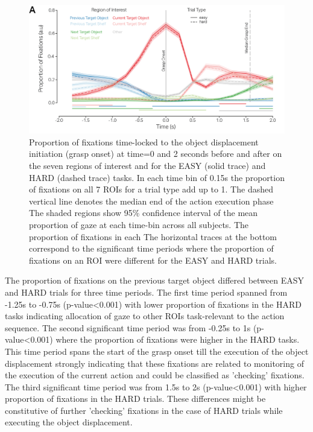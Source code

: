 \begin{figure}[t]
    \centering
    \includegraphics[width=0.9\linewidth]{source/figures/results/results_2.png}
    \caption[Time course of fixations]{Proportion of fixations time-locked to the object displacement initiation (grasp onset) at time=0 and 2 seconds before and after on the seven regions of interest and for the EASY (solid trace) and HARD (dashed trace) tasks. In each time bin of 0.15s the proportion of fixations on all 7 ROIs for a trial type add up to 1. The dashed vertical line denotes the median end of the action execution phase The shaded regions show 95\% confidence interval of the mean proportion of gaze at each time-bin across all subjects. The proportion of fixations in each The horizontal traces at the bottom correspond to the significant time periods where the proportion of fixations on an ROI were different for the EASY and HARD trials.}
    \label{figure:action_locked}
\end{figure}


The proportion of fixations on the previous target object differed between EASY and HARD trials for three time periods. The first time period spanned from -1.25s to -0.75s (p-value<0.001) with lower proportion of fixations in the HARD tasks indicating allocation of gaze to other ROIs task-relevant to the action sequence. The second significant time period was from -0.25s to 1s (p-value<0.001) where the proportion of fixations were higher in the HARD tasks. This time period spans the start of the grasp onset till the execution of the object displacement strongly indicating that these fixations are related to monitoring of the execution of the current action and could be classified as 'checking' fixations. The third significant time period was from 1.5s to 2s (p-value<0.001) with higher proportion of fixations in the HARD trials. These differences might be constitutive of further 'checking' fixations in the case of HARD trials while executing the object displacement. 

